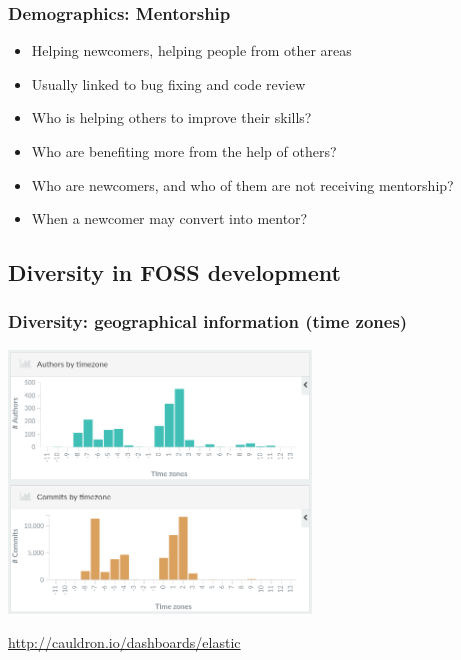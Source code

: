 \documentclass[17pt,aspectratio=169,hyperref=pdfusetitle]{beamer}
\begin{document}
\begin{frame}
\frametitle{Demographics: Mentorship}

{\Large

  \begin{itemize}
  \item Helping newcomers, helping people from other areas \\

  \item Usually linked to bug fixing and code review \\

  \item Who is helping others to improve their skills? \\

  \item Who are benefiting more from the help of others? \\

  \item Who are newcomers, and who of them are not receiving mentorship? \\

  \item When a newcomer may convert into mentor? \\
  \end{itemize}
}
\end{frame}

\subsection{Diversity in FOSS development}


\begin{frame}
\frametitle{Diversity: geographical information (time zones)}

\begin{center}
  \includegraphics[height=7cm]{figs/elastic-git-tz}
\end{center}

\begin{flushright}
  \url{http://cauldron.io/dashboards/elastic}
\end{flushright}
      
\end{frame}
\end{document}
